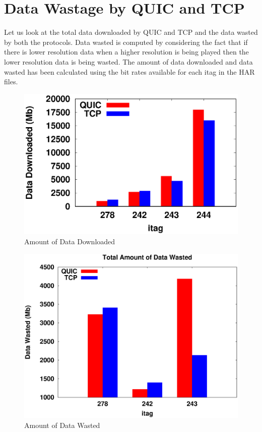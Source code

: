 \section{Data Wastage by QUIC and TCP}

Let us look at the total data downloaded by QUIC and TCP and the data wasted by both the protocols. Data wasted is computed by considering the fact that if there is lower resolution data when a higher resolution is being played then the lower resolution data is being wasted. The amount of data downloaded and data wasted has been calculated using the bit rates available for each itag in the HAR files.

\begin{figure}[ht!]
    \centering
    \includegraphics[width=0.9\linewidth]{img/CDF/Data_Dowloaded}
    \caption{Amount of Data Downloaded}
    \label{fig:rabuf761856q}
\end{figure}
\begin{figure}[ht!]
    \centering
    \includegraphics[width=0.9\linewidth]{img/CDF/DataWasted}
    \caption{Amount of Data Wasted}
    \label{fig:rabuf76q1}
\end{figure}


